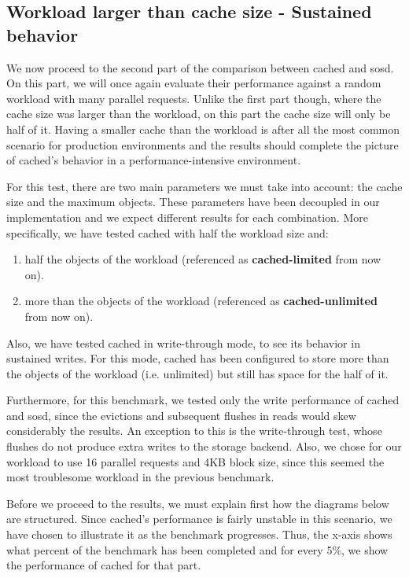\subsection{Workload larger than cache size - Sustained behavior}
\label{sec:sustained-plot}

We now proceed to the second part of the comparison between cached and sosd.  
On this part, we will once again evaluate their performance against a random 
workload with many parallel requests. Unlike the first part though, where the 
cache size was larger than the workload, on this part the cache size will
only be half of it. Having a smaller cache than the workload is after all the 
most common scenario for production environments and the results should 
complete the picture of cached's behavior in a performance-intensive 
environment.

For this test, there are two main parameters we must take into account: the 
cache size and the maximum objects. These parameters have been decoupled in our 
implementation and we expect different results for each combination. More 
specifically, we have tested cached with half the workload size and:

\begin{enumerate}
	\item half the objects of the workload (referenced as 
		\textbf{cached-limited} from now on).
	\item more than the objects of the workload (referenced as 
		\textbf{cached-unlimited} from now on).
\end{enumerate}

Also, we have tested cached in write-through mode, to see its behavior in 
sustained writes. For this mode, cached has been configured to store more than 
the objects of the workload (i.e. unlimited) but still has space for the half 
of it.

Furthermore, for this benchmark, we tested only the write performance of cached 
and sosd, since the evictions and subsequent flushes in reads would skew
considerably the results. An exception to this is the write-through test, whose 
flushes do not produce extra writes to the storage backend.
Also, we chose for our workload to use 16 parallel requests and 4KB block size, 
since this seemed the most troublesome workload in the previous benchmark.

Before we proceed to the results, we must explain first how the diagrams below 
are structured. Since cached's performance is fairly unstable in this scenario, 
we have chosen to illustrate it as the benchmark progresses.  Thus, the x-axis 
shows what percent of the benchmark has been completed and for every 5\%, we 
show the performance of cached for that part.

